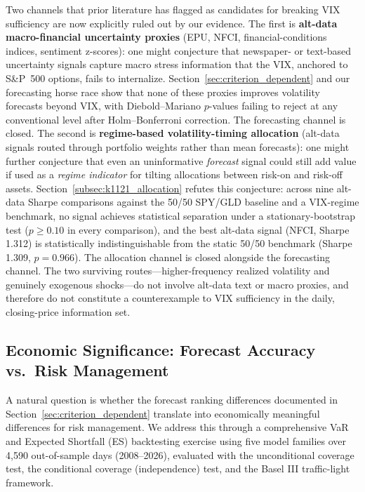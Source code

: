 \documentclass[12pt,a4paper]{article}
\begin{document}
Two channels that prior literature has flagged as candidates for breaking VIX sufficiency are now explicitly ruled out by our evidence. The first is \textbf{alt-data macro-financial uncertainty proxies} (EPU, NFCI, financial-conditions indices, sentiment z-scores): one might conjecture that newspaper- or text-based uncertainty signals capture macro stress information that the VIX, anchored to S\&P~500 options, fails to internalize. Section~\ref{sec:criterion_dependent} and our forecasting horse race show that none of these proxies improves volatility forecasts beyond VIX, with Diebold--Mariano $p$-values failing to reject at any conventional level after Holm--Bonferroni correction. The forecasting channel is closed. The second is \textbf{regime-based volatility-timing allocation} (alt-data signals routed through portfolio weights rather than mean forecasts): one might further conjecture that even an uninformative \emph{forecast} signal could still add value if used as a \emph{regime indicator} for tilting allocations between risk-on and risk-off assets. Section~\ref{subsec:k1121_allocation} refutes this conjecture: across nine alt-data Sharpe comparisons against the 50/50 SPY/GLD baseline and a VIX-regime benchmark, no signal achieves statistical separation under a stationary-bootstrap test ($p \geq 0.10$ in every comparison), and the best alt-data signal (NFCI, Sharpe 1.312) is statistically indistinguishable from the static 50/50 benchmark (Sharpe 1.309, $p = 0.966$). The allocation channel is closed alongside the forecasting channel. The two surviving routes---higher-frequency realized volatility and genuinely exogenous shocks---do not involve alt-data text or macro proxies, and therefore do not constitute a counterexample to VIX sufficiency in the daily, closing-price information set.

\subsection{Economic Significance: Forecast Accuracy vs.\ Risk Management}
\label{sec:economic_significance}

A natural question is whether the forecast ranking differences documented in Section~\ref{sec:criterion_dependent} translate into economically meaningful differences for risk management. We address this through a comprehensive VaR and Expected Shortfall (ES) backtesting exercise using five model families over 4,590 out-of-sample days (2008--2026), evaluated with the \citet{kupiec1995} unconditional coverage test, the \citet{christoffersen1998} conditional coverage (independence) test, and the Basel III traffic-light framework.
\end{document}
